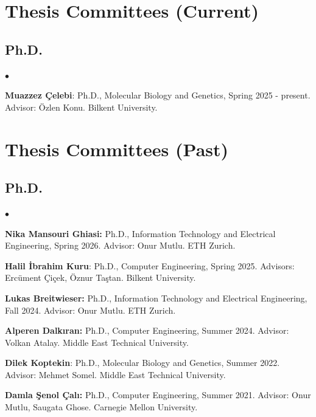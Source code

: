 \documentclass[margin,line]{res}
\newenvironment{list2}{
  \begin{list}{$\bullet$}{%
      \setlength{\itemsep}{0.1cm}
      \setlength{\parsep}{0in} \setlength{\parskip}{0in}
      \setlength{\topsep}{0in} \setlength{\partopsep}{0in} 
      \setlength{\leftmargin}{0.2in}}}{\end{list}}
\begin{document}
\begin{resume}
\section{\sc Thesis Committees (Current)}

\vspace*{-.4cm}
\subsection{\small \sc Ph.D.}
\begin{list2}
\item 
{\bf Muazzez Çelebi}: Ph.D., Molecular Biology and Genetics, Spring 2025 - present.
Advisor: Özlen Konu. Bilkent University.
\end{list2}


\section{\sc Thesis Committees (Past)}
\vspace*{-.4cm}
\subsection{\small \sc Ph.D.}
\begin{list2}
\item 
\textbf{Nika Mansouri Ghiasi:} Ph.D.,  Information Technology and Electrical Engineering, Spring 2026.
Advisor: Onur Mutlu. ETH Zurich.
\item
{\bf Halil İbrahim Kuru}: Ph.D., Computer Engineering, Spring 2025.
  Advisors: Ercüment Çiçek, Öznur Taştan.
  Bilkent University.
\item 
\textbf{Lukas Breitwieser:} Ph.D.,  Information Technology and Electrical Engineering, Fall 2024.
Advisor: Onur Mutlu. ETH Zurich.
\item
  {\bf Alperen Dalkıran:} Ph.D., Computer Engineering, Summer 2024.
  Advisor: Volkan Atalay.
  Middle East Technical University.
\item
{\bf Dilek Koptekin}: Ph.D., Molecular Biology and Genetics, Summer 2022.
Advisor: Mehmet Somel. Middle East Technical University.

\item 
{\bf Damla Şenol Çalı:} Ph.D., Computer Engineering, Summer 2021. Advisor: Onur Mutlu, Saugata Ghose. Carnegie Mellon University.


\end{list2}
\end{resume}
\end{document}
